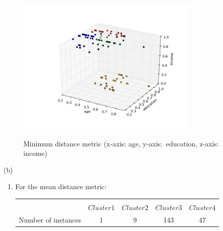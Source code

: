 \documentclass[12pt,letterpaper]{article}
\begin{document}
\begin{enumerate}
\begin{enumerate}
\begin{enumerate}
\begin{tabular}{@{}l | c |  c|  c |  c}
                        \end{tabular}
                        \begin{figure}[H]
                                \centering
                                \caption{Minimum distance metric (x-axis: age, y-axis:\ education, z-axis: income)} {
                                \includegraphics[width=3.5in]{4ba_max.png} }\\
                        \end{figure}
                \end{enumerate}
           (b)\medskip 
           
            \begin{enumerate}
                        
                        \item For the mean distance metric: \medskip \\
                        
                        \begin{tabular}{@{}l | c |  c|  c |  c} \hline \hline  \\ [-2ex]
         & $  Cluster 1  $ & $Cluster 2$ &  $Cluster3$ & $Cluster4$ \\ \hline  \noalign{\smallskip}
      Number of instances   & 1     & 9   & 143  &47  \\ \hline \hline


\end{tabular}
\end{enumerate}
\end{enumerate}
\end{enumerate}
\end{document}
